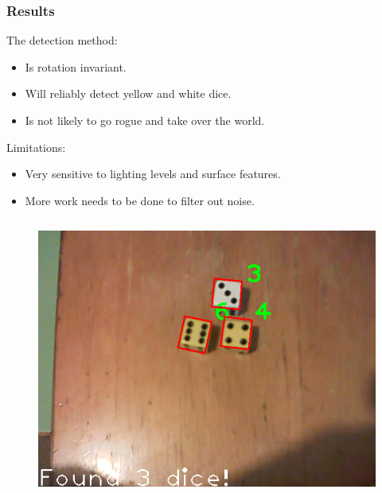 \documentclass{beamer}
\begin{document}
\begin{frame}
\frametitle{Results}

The detection method:
\begin{itemize}
	\item Is rotation invariant.
	\item Will reliably detect yellow and white dice.
	\item Is not likely to go rogue and take over the world.
\end{itemize}

\vspace{\baselineskip}

Limitations:
\begin{itemize}
	\item Very sensitive to lighting levels and surface features.
	\item More work needs to be done to filter out noise.
\end{itemize}

\begin{columns}


\begin{figure}
	\centering
	\includegraphics[width=\textwidth]{dice_1}
\end{figure}



\end{columns}
\end{frame}
\end{document}

